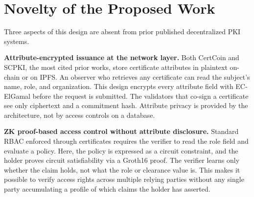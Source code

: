\documentclass[12pt,a4paper]{article}
\begin{document}
\begin{center}
\end{center}

\vspace{0.3cm}

\newpage

\section{Novelty of the Proposed Work}

Three aspects of this design are absent from prior published decentralized PKI systems.

\textbf{Attribute-encrypted issuance at the network layer.} Both CertCoin and SCPKI, the most cited prior works, store certificate attributes in plaintext on-chain or on IPFS. An observer who retrieves any certificate can read the subject's name, role, and organization. This design encrypts every attribute field with EC-ElGamal before the request is submitted. The validators that co-sign a certificate see only ciphertext and a commitment hash. Attribute privacy is provided by the architecture, not by access controls on a database.

\textbf{ZK proof-based access control without attribute disclosure.} Standard RBAC enforced through certificates requires the verifier to read the role field and evaluate a policy. Here, the policy is expressed as a circuit constraint, and the holder proves circuit satisfiability via a Groth16 proof. The verifier learns only whether the claim holds, not what the role or clearance value is. This makes it possible to verify access rights across multiple relying parties without any single party accumulating a profile of which claims the holder has asserted.
\end{document}
